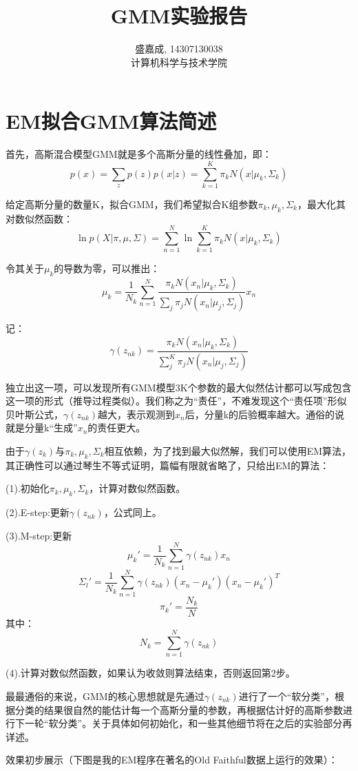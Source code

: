 \documentclass[hyperref,UTF8]{ctexart}
\begin{document}
\title{GMM实验报告}
\author{盛嘉成, 14307130038 \\ 计算机科学与技术学院}
\maketitle

\section*{EM拟合GMM算法简述}
首先，高斯混合模型GMM就是多个高斯分量的线性叠加，即：
\[p(x)=\sum_z p(z)p(x|z) = \sum_{k=1}^{K} \pi_k N(x|\mu_k,\Sigma_k)\]
\par 给定高斯分量的数量K，拟合GMM，我们希望拟合K组参数$\pi_k,\mu_k,\Sigma_k$，最大化其对数似然函数：
\[\ln p(X|\pi,\mu,\Sigma) = \sum_{n=1}^N \ln {\sum_{k=1}^K \pi_k N(x|\mu_k,\Sigma_k)}\]
\par 令其关于$\mu_k$的导数为零，可以推出：
\[\mu_k = \frac{1}{N_k}\sum_{n=1}^{N} \frac{\pi_k N(x_n|\mu_k,\Sigma_k)}{\sum_j \pi_j N(x_n|\mu_j,\Sigma_j)}x_n \]
\par 记：
\[\gamma(z_{nk})=\frac{\pi_k N(x_n|\mu_k,\Sigma_k)}{\sum_j^K \pi_j N(x_n|\mu_j,\Sigma_j)}\]
\par 独立出这一项，可以发现所有GMM模型3K个参数的最大似然估计都可以写成包含这一项的形式（推导过程类似）。我们称之为“责任”，不难发现这个“责任项”形似贝叶斯公式，$\gamma(z_{nk})$越大，表示观测到$x_n$后，分量k的后验概率越大。通俗的说就是分量k“生成”$x_n$的责任更大。
\par 由于$\gamma(z_{k})$与$\pi_k,\mu_k,\Sigma_k$相互依赖，为了找到最大似然解，我们可以使用EM算法，其正确性可以通过琴生不等式证明，篇幅有限就省略了，只给出EM的算法：
\par (1).初始化$\pi_k,\mu_k,\Sigma_k$，计算对数似然函数。
\par (2).E-step:更新$\gamma(z_{nk})$，公式同上。
\par (3).M-step:更新
\[\mu_k' = \frac{1}{N_k}\sum_{n=1}^{N}\gamma(z_{nk})x_n\]
\[\Sigma_l' =  \frac{1}{N_k}\sum_{n=1}^{N}\gamma(z_{nk})(x_n-\mu_k')(x_n-\mu_k')^T\]
\[\pi_k'=\frac{N_k}{N}\]
其中：
\[N_k=\sum_{n=1}^N \gamma (z_{nk})\]
\par (4).计算对数似然函数，如果认为收敛则算法结束，否则返回第2步。
\par 最最通俗的来说，GMM的核心思想就是先通过$\gamma(z_{nk})$进行了一个“软分类”，根据分类的结果很自然的能估计每一个高斯分量的参数，再根据估计好的高斯参数进行下一轮“软分类”。关于具体如何初始化，和一些其他细节将在之后的实验部分再详述。
\par 效果初步展示（下图是我的EM程序在著名的Old Faithful数据上运行的效果）：\\
\end{document}
